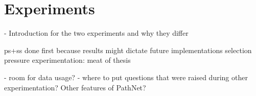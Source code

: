 \chapter{Experiments}
- Introduction for the two experiments and why they differ

ps+ss done first because results might dictate future implementations
selection pressure experimentation: meat of thesis

- room for data usage?
- where to put questions that were raised during other experimentation? Other features of PathNet?

%
%





\iffalse
    X   Did you actually build it? 
    X   How can you test it? 
    X   How did you test it? 
    X   Why did you test it this way? 
    Are the results satisfactory? 
    X   Why should you (not) test it more? 
    X   What compensations had to be made to interpret the results? 
    Why did you succeed/fail? 
    
    \section{Result} 
    Answers to the forwarded questions by means of the achieved results. 
    \subsection{Common errors}
    The results are not properly connected to the problem; blurry presentation; the results are inter-mixed with discussion.  
\fi